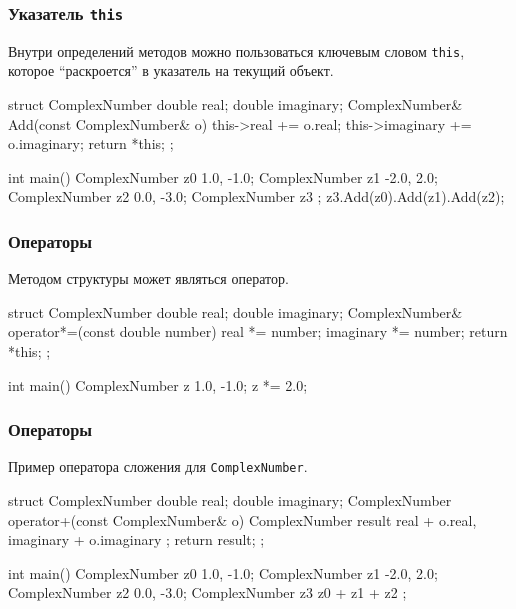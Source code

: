 \documentclass[compress, 8pt, aspectratio=169]{beamer}
\begin{document}
\begin{frame}[fragile]

    \frametitle{Указатель \texttt{this}}

    \hfill\break
    Внутри определений методов можно пользоваться ключевым словом
    \verb|this|\footnotemark{},
    которое \enquote{раскроется} в указатель на текущий объект.


    \begin{myinplacelisting}[minted language=cpp]
struct ComplexNumber {
    double real;
    double imaginary;
    ComplexNumber& Add(const ComplexNumber& o) {
        this->real += o.real;
        this->imaginary += o.imaginary;
        return *this;
    }
};

int main() {
    ComplexNumber z0 {1.0, -1.0};
    ComplexNumber z1 {-2.0, 2.0};
    ComplexNumber z2 {0.0, -3.0};
    ComplexNumber z3 {};
    z3.Add(z0).Add(z1).Add(z2);
}
    \end{myinplacelisting}

\end{frame}

\begin{frame}[fragile]

    \frametitle{Операторы}

    Методом структуры может являться оператор.

    \begin{myinplacelisting}[minted language=cpp]
struct ComplexNumber {
    double real;
    double imaginary;
    ComplexNumber& operator*=(const double number) {
        real *= number;
        imaginary *= number;
        return *this;
    }
};

int main() {
    ComplexNumber z {1.0, -1.0};
    z *= 2.0;
}
    \end{myinplacelisting}

\end{frame}

\begin{frame}[fragile]

    \frametitle{Операторы}

    Пример оператора сложения для \verb|ComplexNumber|.

    \begin{myinplacelisting}[minted language=cpp]
struct ComplexNumber {
    double real;
    double imaginary;
    ComplexNumber operator+(const ComplexNumber& o) {
        ComplexNumber result {
            real + o.real,
            imaginary + o.imaginary
        };
        return result;
    }
};

int main() {
    ComplexNumber z0 {1.0, -1.0};
    ComplexNumber z1 {-2.0, 2.0};
    ComplexNumber z2 {0.0, -3.0};
    ComplexNumber z3 { z0 + z1 + z2 };
}
    \end{myinplacelisting}

\end{frame}
\end{document}
